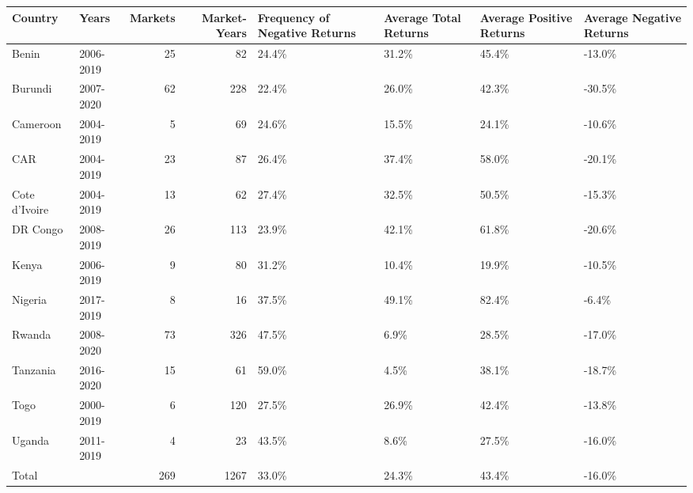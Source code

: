 \begin{table}[ht]
\centering
\begin{tabular}{llrrllll}
  \hline
Country & Years & Markets & Market-Years & Frequency of Negative Returns & Average Total Returns & Average Positive Returns & Average Negative Returns \\ 
  \hline
Benin & 2006-2019 &  25 &  82 & 24.4\% & 31.2\% & 45.4\% & -13.0\% \\ 
  Burundi & 2007-2020 &  62 & 228 & 22.4\% & 26.0\% & 42.3\% & -30.5\% \\ 
  Cameroon & 2004-2019 &   5 &  69 & 24.6\% & 15.5\% & 24.1\% & -10.6\% \\ 
  CAR & 2004-2019 &  23 &  87 & 26.4\% & 37.4\% & 58.0\% & -20.1\% \\ 
  Cote d'Ivoire & 2004-2019 &  13 &  62 & 27.4\% & 32.5\% & 50.5\% & -15.3\% \\ 
  DR Congo & 2008-2019 &  26 & 113 & 23.9\% & 42.1\% & 61.8\% & -20.6\% \\ 
  Kenya & 2006-2019 &   9 &  80 & 31.2\% & 10.4\% & 19.9\% & -10.5\% \\ 
  Nigeria & 2017-2019 &   8 &  16 & 37.5\% & 49.1\% & 82.4\% & -6.4\% \\ 
  Rwanda & 2008-2020 &  73 & 326 & 47.5\% & 6.9\% & 28.5\% & -17.0\% \\ 
  Tanzania & 2016-2020 &  15 &  61 & 59.0\% & 4.5\% & 38.1\% & -18.7\% \\ 
  Togo & 2000-2019 &   6 & 120 & 27.5\% & 26.9\% & 42.4\% & -13.8\% \\ 
  Uganda & 2011-2019 &   4 &  23 & 43.5\% & 8.6\% & 27.5\% & -16.0\% \\ 
  Total &   & 269 & 1267 & 33.0\% & 24.3\% & 43.4\% & -16.0\% \\ 
   \hline
\end{tabular}
\end{table}
